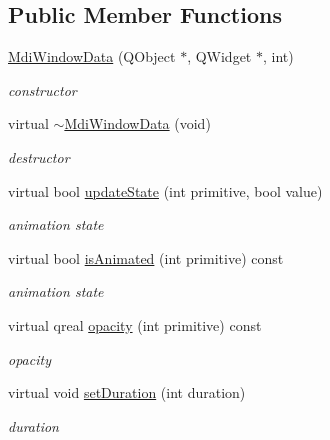 \subsection*{Public Member Functions}
\begin{DoxyCompactItemize}
\item 
\mbox{\label{class_mdi_window_data_a80c96580eb951adbcc4d21f3e3c33142}} 
\hyperlink{class_mdi_window_data_a80c96580eb951adbcc4d21f3e3c33142}{Mdi\+Window\+Data} (Q\+Object $\ast$, Q\+Widget $\ast$, int)
\begin{DoxyCompactList}\small\item\em constructor \end{DoxyCompactList}\item 
\mbox{\label{class_mdi_window_data_a5246e80ad56617763df7762fb5c7a991}} 
virtual \hyperlink{class_mdi_window_data_a5246e80ad56617763df7762fb5c7a991}{$\sim$\+Mdi\+Window\+Data} (void)
\begin{DoxyCompactList}\small\item\em destructor \end{DoxyCompactList}\item 
\mbox{\label{class_mdi_window_data_a5dc3f8096d9c964774429bbe0861d213}} 
virtual bool \hyperlink{class_mdi_window_data_a5dc3f8096d9c964774429bbe0861d213}{update\+State} (int primitive, bool value)
\begin{DoxyCompactList}\small\item\em animation state \end{DoxyCompactList}\item 
\mbox{\label{class_mdi_window_data_aeefa27147d96f191a4b0d9bdbf2aaa1e}} 
virtual bool \hyperlink{class_mdi_window_data_aeefa27147d96f191a4b0d9bdbf2aaa1e}{is\+Animated} (int primitive) const
\begin{DoxyCompactList}\small\item\em animation state \end{DoxyCompactList}\item 
\mbox{\label{class_mdi_window_data_a0ed2f8cea2417c95d88b493c6fe65583}} 
virtual qreal \hyperlink{class_mdi_window_data_a0ed2f8cea2417c95d88b493c6fe65583}{opacity} (int primitive) const
\begin{DoxyCompactList}\small\item\em opacity \end{DoxyCompactList}\item 
\mbox{\label{class_mdi_window_data_ab57b96b071f2510424c9c5bf6b436296}} 
virtual void \hyperlink{class_mdi_window_data_ab57b96b071f2510424c9c5bf6b436296}{set\+Duration} (int duration)
\begin{DoxyCompactList}\small\item\em duration \end{DoxyCompactList}\end{DoxyCompactItemize}
